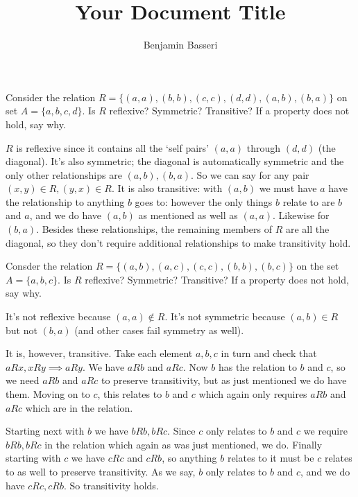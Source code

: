 \documentclass{article}
\title{Your Document Title}
\author{Benjamin Basseri}
\begin{document}
\maketitle

\begin{problem}
Consider the relation $R = \{(a, a), (b, b), (c, c), (d, d), (a, b), (b, a)\}$ on set $A = \{a, b, c, d\}$. Is $R$ reflexive? Symmetric? Transitive? If a property does not hold, say why.
\end{problem}

$R$ is reflexive since it contains all the `self pairs' $(a, a)$ through $(d, d)$ (the diagonal). It's also symmetric; the diagonal is automatically symmetric and the only other relationships are $(a, b), (b, a)$. So we can say for any pair $(x, y) \in R, (y, x) \in R$. It is also transitive: with $(a, b)$ we must have $a$ have the relationship to anything $b$ goes to: however the only things $b$ relate to are $b$ and $a$, and we do have $(a, b)$ as mentioned as well as $(a, a)$. Likewise for $(b, a)$. Besides these relationships, the remaining members of $R$ are all the diagonal, so they don't require additional relationships to make transitivity hold.

\begin{problem}
Consder the relation $R =\{(a, b), (a, c), (c, c), (b, b), (b, c)\}$ on the set $A = \{a, b, c\}$. Is $R$ reflexive? Symmetric? Transitive? If a property does not hold, say why.
\end{problem}

It's not reflexive because $(a, a) \not\in R$. It's not symmetric because $(a, b) \in R$ but not $(b, a)$ (and other cases fail symmetry as well).

It is, however, transitive. Take each element $a, b, c$ in turn and check that $aRx, xRy \implies aRy$. We have $aRb$ and $aRc$. Now $b$ has the relation to $b$ and $c$, so we need $aRb$ and $aRc$ to preserve transitivity, but as just mentioned we do have them. Moving on to $c$, this relates to $b$ and $c$ which again only requires $aRb$ and $aRc$ which are in the relation.

Starting next with $b$ we have $bRb, bRc$. Since $c$ only relates to $b$ and $c$ we require $bRb, bRc$ in the relation which again as was just mentioned, we do. Finally starting with $c$ we have $cRc$ and $cRb$, so anything $b$ relates to it must be $c$ relates to as well to preserve transitivity. As we say, $b$ only relates to $b$ and $c$, and we do have $cRc, cRb$. So transitivity holds.
\end{document}
